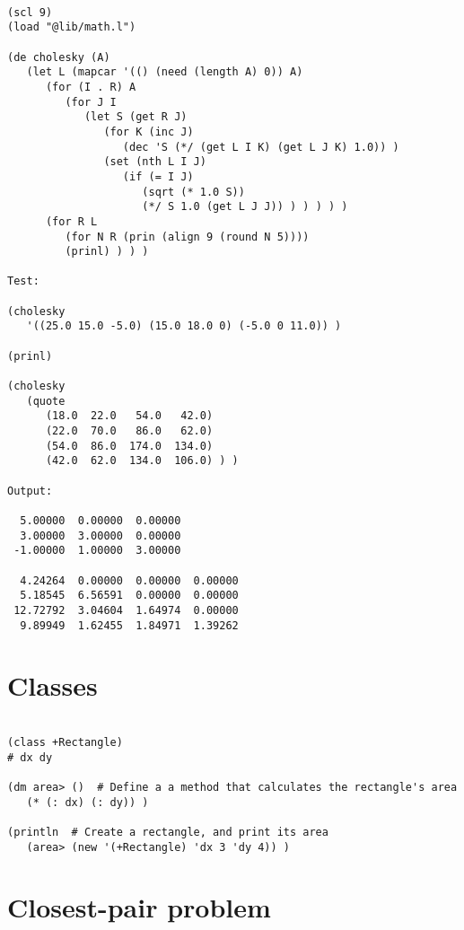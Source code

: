 \begin{verbatim}

(scl 9)
(load "@lib/math.l")

(de cholesky (A)
   (let L (mapcar '(() (need (length A) 0)) A)
      (for (I . R) A
         (for J I
            (let S (get R J)
               (for K (inc J)
                  (dec 'S (*/ (get L I K) (get L J K) 1.0)) )
               (set (nth L I J)
                  (if (= I J)
                     (sqrt (* 1.0 S))
                     (*/ S 1.0 (get L J J)) ) ) ) ) )
      (for R L
         (for N R (prin (align 9 (round N 5))))
         (prinl) ) ) )

Test:

(cholesky
   '((25.0 15.0 -5.0) (15.0 18.0 0) (-5.0 0 11.0)) )

(prinl)

(cholesky
   (quote
      (18.0  22.0   54.0   42.0)
      (22.0  70.0   86.0   62.0)
      (54.0  86.0  174.0  134.0)
      (42.0  62.0  134.0  106.0) ) )

Output:

  5.00000  0.00000  0.00000
  3.00000  3.00000  0.00000
 -1.00000  1.00000  3.00000

  4.24264  0.00000  0.00000  0.00000
  5.18545  6.56591  0.00000  0.00000
 12.72792  3.04604  1.64974  0.00000
  9.89949  1.62455  1.84971  1.39262

\end{verbatim}

\section*{Classes}

\begin{verbatim}

(class +Rectangle)
# dx dy

(dm area> ()  # Define a a method that calculates the rectangle's area
   (* (: dx) (: dy)) )

(println  # Create a rectangle, and print its area
   (area> (new '(+Rectangle) 'dx 3 'dy 4)) )

\end{verbatim}

\section*{Closest-pair problem}

